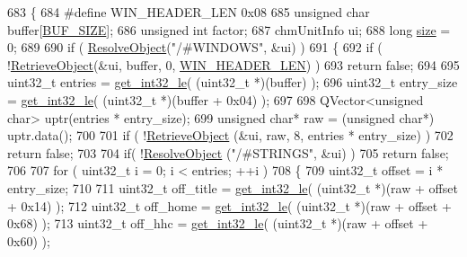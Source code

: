 \begin{DoxyCode}
683 \{
684 \textcolor{preprocessor}{#define WIN\_HEADER\_LEN 0x08}
685     \textcolor{keywordtype}{unsigned} \textcolor{keywordtype}{char} buffer[\hyperlink{libchmfileimpl_8cpp_a6821bafc3c88dfb2e433a095df9940c6}{BUF\_SIZE}];
686     \textcolor{keywordtype}{unsigned} \textcolor{keywordtype}{int} factor;
687     chmUnitInfo ui;
688     \textcolor{keywordtype}{long} \hyperlink{synctex__parser_8c_aa23c661441688350614bd6a350d2b6ff}{size} = 0;
689 
690     \textcolor{keywordflow}{if} ( \hyperlink{classLCHMFileImpl_a78d3e549251cd4c842aecca5aa1ede36}{ResolveObject}(\textcolor{stringliteral}{"/#WINDOWS"}, &ui) )
691     \{
692         \textcolor{keywordflow}{if} ( !\hyperlink{classLCHMFileImpl_a8535dce5eb8f22161ecf3510fde8aa4e}{RetrieveObject}(&ui, buffer, 0, \hyperlink{libchmfileimpl_8cpp_a4f5589e322a8a2b6e3ead968320c86d8}{WIN\_HEADER\_LEN}) )
693             \textcolor{keywordflow}{return} \textcolor{keyword}{false};
694 
695         uint32\_t entries = \hyperlink{bitfiddle_8h_aa84a55d4947b4ac2b8a52032cbaadd59}{get\_int32\_le}( (uint32\_t *)(buffer) );
696         uint32\_t entry\_size = \hyperlink{bitfiddle_8h_aa84a55d4947b4ac2b8a52032cbaadd59}{get\_int32\_le}( (uint32\_t *)(buffer + 0x04) );
697         
698         QVector<unsigned char> uptr(entries * entry\_size);
699         \textcolor{keywordtype}{unsigned} \textcolor{keywordtype}{char}* raw = (\textcolor{keywordtype}{unsigned} \textcolor{keywordtype}{char}*) uptr.data();
700         
701         \textcolor{keywordflow}{if} ( !\hyperlink{classLCHMFileImpl_a8535dce5eb8f22161ecf3510fde8aa4e}{RetrieveObject} (&ui, raw, 8, entries * entry\_size) )
702             \textcolor{keywordflow}{return} \textcolor{keyword}{false};
703 
704         \textcolor{keywordflow}{if}( !\hyperlink{classLCHMFileImpl_a78d3e549251cd4c842aecca5aa1ede36}{ResolveObject} (\textcolor{stringliteral}{"/#STRINGS"}, &ui) )
705             \textcolor{keywordflow}{return} \textcolor{keyword}{false};
706 
707         \textcolor{keywordflow}{for} ( uint32\_t i = 0; i < entries; ++i )
708         \{
709             uint32\_t offset = i * entry\_size;
710             
711             uint32\_t off\_title = \hyperlink{bitfiddle_8h_aa84a55d4947b4ac2b8a52032cbaadd59}{get\_int32\_le}( (uint32\_t *)(raw + offset + 0x14) );
712             uint32\_t off\_home = \hyperlink{bitfiddle_8h_aa84a55d4947b4ac2b8a52032cbaadd59}{get\_int32\_le}( (uint32\_t *)(raw + offset + 0x68) );
713             uint32\_t off\_hhc = \hyperlink{bitfiddle_8h_aa84a55d4947b4ac2b8a52032cbaadd59}{get\_int32\_le}( (uint32\_t *)(raw + offset + 0x60) );

\end{DoxyCode}
